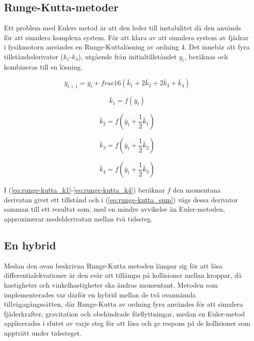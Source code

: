\documentclass[a4paper,12pt,twopage,swedish]{article}
\begin{document}
\subsection{Runge-Kutta-metoder}
Ett problem med Eulers metod är att den leder till instabilitet då den används för att simulera komplexa system. För att klara av att simulera system av fjädrar i fysikmotorn användes en Runge-Kuttalösning av ordning 4. Det innebär att fyra tillståndsderivator ($k_1$-$k_4$), utgående från initialtillståndet $y_t$, beräknas och kombineras till en lösning.

\begin{equation}\label{eq:runge-kutta_sum}
\bar{y}_{t+1} = \bar{y}_t + frac{1}{6}(\bar{k}_1 + 2\bar{k}_2 + 2\bar{k}_3 + \bar{k}_4)
\end{equation}

\begin{equation}\label{eq:runge-kutta_k1}
\bar{k}_1 = f(\bar{y}_t)
\end{equation}

\begin{equation}\label{eq:runge-kutta_k2}
\bar{k}_2 = f(\bar{y}_t + \frac{1}{2}\bar{k}_1)
\end{equation}

\begin{equation}\label{eq:runge-kutta_k3}
\bar{k}_3 = f(\bar{y}_t + \frac{1}{2}\bar{k}_2)
\end{equation}

\begin{equation}\label{eq:runge-kutta_k4}
\bar{k}_4 = f(\bar{y}_t + \frac{1}{2}\bar{k}_3)
\end{equation}

I (\ref{eq:runge-kutta_k1}-\ref{eq:runge-kutta_k4}) beräknar $f$ den momentana derivatan givet ett tillstånd och i (\ref{eq:runge-kutta_sum}) vägs dessa derivator samman till ett resultat som, med en mindre avvikelse än Euler-metoden, approximerar medelderivatan mellan två tidssteg.

\subsection{En hybrid}
Medan den ovan beskrivna Runge-Kutta metoden lämpar sig för att lösa differentialekvationer är den svår att tillämpa på kollisioner mellan kroppar, då hastigheter och vinkelhastigheter ska ändras momentant. Metoden som implementerades var därför en hybrid mellan de två ovannämda tillvägagångssätten, där Runge-Kutta av ordning fyra användes för att simulera fjäderkrafter, gravitation och obehindrade förflyttningar, medan en Euler-metod applicerades i slutet av varje steg för att lösa och ge respons på de kollisioner som uppträtt under tidssteget.
\end{document}
